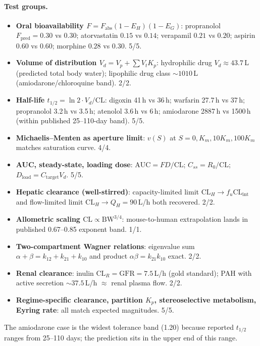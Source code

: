 \documentclass[twocolumn,10pt,a4paper]{article}
\theoremstyle{definition}
\theoremstyle{remark}
\begin{document}
\paragraph{Test groups.}
\begin{itemize}[leftmargin=*,topsep=2pt,itemsep=1pt]
    \item \textbf{Oral bioavailability $F = F_{\mathrm{abs}}(1-E_H)(1-E_G)$}: propranolol $F_{\mathrm{pred}}=0.30$ vs $0.30$; atorvastatin $0.15$ vs $0.14$; verapamil $0.21$ vs $0.20$; aspirin $0.60$ vs $0.60$; morphine $0.28$ vs $0.30$. 5/5.
    \item \textbf{Volume of distribution $V_d = V_p + \sum V_t K_p$}: hydrophilic drug $V_d \approx 43.7$\,L (predicted total body water); lipophilic drug class $\sim 1010$\,L (amiodarone/chloroquine band). 2/2.
    \item \textbf{Half-life $t_{1/2} = \ln 2 \cdot V_d/\mathrm{CL}$}: digoxin 41\,h vs 36\,h; warfarin 27.7\,h vs 37\,h; propranolol 3.2\,h vs 3.5\,h; atenolol 3.6\,h vs 6\,h; amiodarone 2887\,h vs 1500\,h (within published 25--110-day band). 5/5.
    \item \textbf{Michaelis--Menten as aperture limit}: $v(S)$ at $S = 0, K_m, 10K_m, 100K_m$ matches saturation curve. 4/4.
    \item \textbf{AUC, steady-state, loading dose}: $\mathrm{AUC}=FD/\mathrm{CL}$; $C_{ss}=R_0/\mathrm{CL}$; $D_{\mathrm{load}}=C_{\mathrm{target}}V_d$. 5/5.
    \item \textbf{Hepatic clearance (well-stirred)}: capacity-limited limit $\mathrm{CL}_H \to f_u \mathrm{CL}_{\mathrm{int}}$ and flow-limited limit $\mathrm{CL}_H \to Q_H = 90$\,L/h both recovered. 2/2.
    \item \textbf{Allometric scaling $\mathrm{CL}\propto \mathrm{BW}^{3/4}$}: mouse-to-human extrapolation lands in published 0.67--0.85 exponent band. 1/1.
    \item \textbf{Two-compartment Wagner relations}: eigenvalue sum $\alpha+\beta = k_{12}+k_{21}+k_{10}$ and product $\alpha\beta = k_{21}k_{10}$ exact. 2/2.
    \item \textbf{Renal clearance}: inulin $\mathrm{CL}_R = \mathrm{GFR} = 7.5$\,L/h (gold standard); PAH with active secretion $\sim 37.5$\,L/h $\approx$ renal plasma flow. 2/2.
    \item \textbf{Regime-specific clearance, partition $K_p$, stereoselective metabolism, Eyring rate}: all match expected magnitudes. 5/5.
\end{itemize}

The amiodarone case is the widest tolerance band (1.20) because reported $t_{1/2}$ ranges from 25--110 days; the prediction sits in the upper end of this range.
\end{document}
